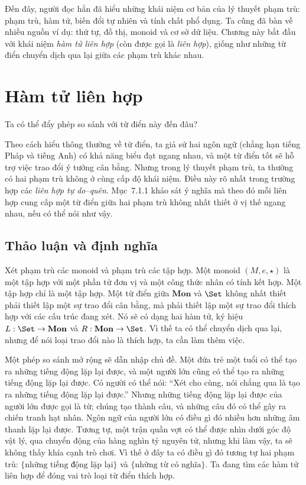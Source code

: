 Đến đây, người đọc hẳn đã hiểu những khái niệm cơ bản của lý thuyết phạm trù: phạm trù, hàm tử, biến đổi tự nhiên và tính chất phổ dụng. Ta cũng đã bàn về nhiều nguồn ví dụ: thứ tự, đồ thị, monoid và cơ sở dữ liệu. Chương này bắt đầu với khái niệm \emph{hàm tử liên hợp} (còn được gọi là \emph{liên hợp}), giống như những từ điển chuyển dịch qua lại giữa các phạm trù khác nhau.

\section{Hàm tử liên hợp}

Ta có thể đẩy phép so sánh với từ điển này đến đâu?

Theo cách hiểu thông thường về từ điển, ta giả sử hai ngôn ngữ (chẳng hạn tiếng Pháp và tiếng Anh) có khả năng biểu đạt ngang nhau, và một từ điển tốt sẽ hỗ trợ việc trao đổi ý tưởng cân bằng. Nhưng trong lý thuyết phạm trù, ta thường có hai phạm trù không ở cùng cấp độ khái niệm. Điều này rõ nhất trong trường hợp các \emph{liên hợp tự do--quên}. Mục~7.1.1 khảo sát ý nghĩa mà theo đó mỗi liên hợp cung cấp một từ điển giữa hai phạm trù không nhất thiết ở vị thế ngang nhau, nếu có thể nói như vậy.

\subsection{Thảo luận và định nghĩa}

Xét phạm trù các monoid và phạm trù các tập hợp. Một monoid $(M,e,\star)$ là một tập hợp với một phần tử đơn vị và một công thức nhân có tính kết hợp. Một tập hợp chỉ là một tập hợp. Một từ điển giữa $\mathbf{Mon}$ và $\Set$ không nhất thiết phải thiết lập một sự trao đổi cân bằng, mà phải thiết lập một sự trao đổi thích hợp với các cấu trúc đang xét. Nó sẽ có dạng hai hàm tử, ký hiệu $L:\Set\to\mathbf{Mon}$ và $R:\mathbf{Mon}\to\Set$. Vì thế ta có thể chuyển dịch qua lại, nhưng để nói loại trao đổi nào là thích hợp, ta cần làm thêm việc.

Một phép so sánh mở rộng sẽ dẫn nhập chủ đề. Một đứa trẻ một tuổi có thể tạo ra những tiếng động lặp lại được, và một người lớn cũng có thể tạo ra những tiếng động lặp lại được. Có người có thể nói: ``Xét cho cùng, nói chẳng qua là tạo ra những tiếng động lặp lại được.'' Nhưng những tiếng động lặp lại được của người lớn được gọi là từ; chúng tạo thành câu, và những câu đó có thể gây ra chiến tranh hạt nhân. Ngôn ngữ của người lớn có điều gì đó nhiều hơn những âm thanh lặp lại được. Tương tự, một trận quần vợt có thể được nhìn dưới góc độ vật lý, qua chuyển động của hàng nghìn tỷ nguyên tử, nhưng khi làm vậy, ta sẽ không thấy khía cạnh trò chơi. Vì thế ở đây ta có điều gì đó tương tự hai phạm trù: $\{\text{những tiếng động lặp lại}\}$ và $\{\text{những từ có nghĩa}\}$. Ta đang tìm các hàm tử liên hợp để đóng vai trò loại từ điển thích hợp.

